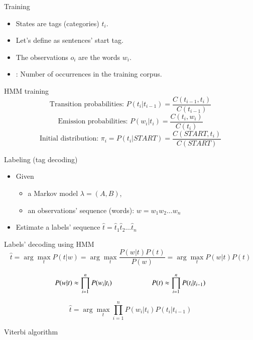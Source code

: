 \documentclass{KBook}
\begin{document}
Training
	
	\begin{itemize}
		\item States are tags (categories) $t_i$.
		\item Let's define  as sentences' start tag.
		\item The observations $o_i$ are the words $w_i$.
		\item {}: Number of occurrences in the training corpus.
	\end{itemize}
	
	\begin{block}{HMM training}
		\[
		\text{Transition probabilities: } P(t_i | t_{i-1}) = \frac{C(t_{i-1}, t_i)}{C(t_{i-1})} 
		\]\[
		\text{Emission probabilities: } P(w_i | t_i) = \frac{C(t_i, w_i)}{C(t_i)}
		\]\[
		\text{Initial distribution: } \pi_i = P(t_i | START) = \frac{C(START, t_i)}{C(START)}
		\]
	\end{block}

Labeling (tag decoding)
	
	\begin{itemize}
		\item Given
		\begin{itemize}
			\item a Markov model $\lambda = (A, B)$,
			\item an observations' sequence (words): $w = w_1 w_2 \ldots w_n$
		\end{itemize}
		\item Estimate a labels' sequence $\hat{t} = \hat{t}_1 \hat{t}_2 \ldots \hat{t}_n$
	\end{itemize}
	
	\begin{block}{Labels' decoding using HMM}
		\[
		\hat{t} = \arg\max\limits_t P(t | w) = \arg\max\limits_t \frac{P(w|t) P(t)}{P(w)} = \arg\max\limits_t P(w|t) P(t)%
		\]
		
		\[ 
		P(w | t) \approx \prod\limits_{i=1}^n P(w_i|t_i) 
		\hskip2cm
		P(t) \approx \prod\limits_{i=1}^n P(t_i|t_{i-1}) 
		\]
		
		\[
		\hat{t} = \arg\max\limits_t \prod\limits_{i=1}^n P(w_i|t_i) P(t_i|t_{i-1})
		\]
	\end{block}

Viterbi algorithm
	
\end{document}
